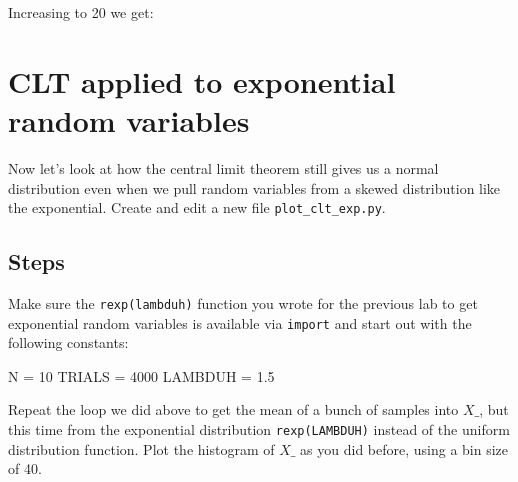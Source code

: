 \begin{fullwidth}
\step Increasing to 20 we get:


\section{CLT applied to exponential random variables}

Now let's look at how the central limit theorem still gives us a normal distribution even when we pull random variables from a skewed distribution like the exponential. Create and edit a new file {\tt plot\_clt\_exp.py}.

\subsection{Steps}

\step Make sure the {\tt rexp(lambduh)} function you wrote for the previous lab to get exponential random variables is available via {\tt import} and start out with the following constants:

\begin{pyverbatim}
N = 10
TRIALS = 4000
LAMBDUH = 1.5
\end{pyverbatim}

\step Repeat the loop we did above to get the mean of a bunch of samples into $X\_$, but this time from the exponential distribution {\tt rexp(LAMBDUH)} instead of the uniform distribution function. Plot the histogram of $X\_$ as you did before, using a bin size of 40.


\end{fullwidth}

